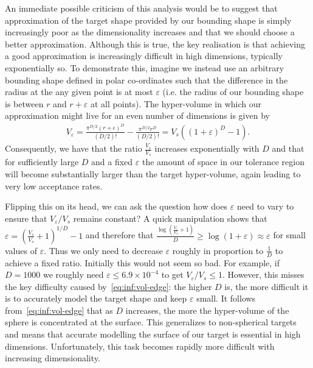 An immediate possible criticism of this analysis would be to suggest that approximation of the
target shape provided by our bounding shape is simply increasingly poor as the dimensionality 
increases and that we should choose 
a better approximation.  Although this is true, the key realisation is that achieving a good approximation
is increasingly difficult in high dimensions, typically exponentially so.
To demonstrate this, imagine we instead use an arbitrary bounding shape defined in polar
co-ordinates such that the difference in the radius at the any given point is at most $\varepsilon$
(i.e. the radius of our bounding shape is between $r$ and $r+\varepsilon$ at all points).
The hyper-volume in which our approximation might live for an even number of dimensions
is given by
\begin{align}
\label{eq:inf:vol-edge}
V_{\varepsilon} = \frac{\pi^{D/2}(r+\epsilon)^D}{(D/2)!}-\frac{\pi^{D/2}r^D}{(D/2)!}
= V_s \left((1+\varepsilon)^D-1\right).
\end{align}
Consequently, we have that the ratio $\frac{V_{\varepsilon}}{V_s}$ increases exponentially with $D$
and that for sufficiently large $D$ and a fixed $\varepsilon$ the amount of space in our tolerance
region will become substantially larger than the target hyper-volume, again leading to very low acceptance
rates.

Flipping this on its head, we can ask the question how does $\varepsilon$ need to vary
to ensure that $V_{\varepsilon}/V_s$ remains constant?  A quick manipulation shows
that $\varepsilon = \left(\frac{V_{\varepsilon}}{V_s}+1\right)^{1/D}-1$ and therefore that
$\frac{\log \left(\frac{V_{\varepsilon}}{V_s}+1\right)}{D} \ge \log(1+\varepsilon) \approx \varepsilon$
for small values of $\varepsilon$.  Thus we only need to decrease $\varepsilon$ roughly
in proportion to $\frac{1}{D}$ to achieve a fixed ratio.  Initially this would not seem
so bad.  For example, if $D=1000$ we
roughly need $\varepsilon \le 6.9 \times 10^{-4}$ to get $V_{\varepsilon}/V_s \le 1$.
However, this misses the
key difficulty caused by~\eqref{eq:inf:vol-edge}: the higher $D$ is, the more difficult it is
to accurately model the target shape and keep $\varepsilon$ small.  
It follows from~\eqref{eq:inf:vol-edge} that as $D$ increases, the more the hyper-volume
of the sphere is concentrated at the surface.  This generalizes to non-spherical targets and
means that accurate modelling the surface of our target is essential in high dimensions.
Unfortunately, this task becomes rapidly more difficult with increasing dimensionality.  

